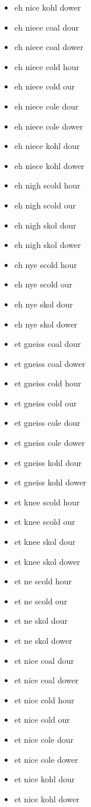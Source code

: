 \begin{itemize}
\item eh nice kohl dower
\item eh niece coal dour
\item eh niece coal dower
\item eh niece cold hour
\item eh niece cold our
\item eh niece cole dour
\item eh niece cole dower
\item eh niece kohl dour
\item eh niece kohl dower
\item eh nigh scold hour
\item eh nigh scold our
\item eh nigh skol dour
\item eh nigh skol dower
\item eh nye scold hour
\item eh nye scold our
\item eh nye skol dour
\item eh nye skol dower
\item et gneiss coal dour
\item et gneiss coal dower
\item et gneiss cold hour
\item et gneiss cold our
\item et gneiss cole dour
\item et gneiss cole dower
\item et gneiss kohl dour
\item et gneiss kohl dower
\item et knee scold hour
\item et knee scold our
\item et knee skol dour
\item et knee skol dower
\item et ne scold hour
\item et ne scold our
\item et ne skol dour
\item et ne skol dower
\item et nice coal dour
\item et nice coal dower
\item et nice cold hour
\item et nice cold our
\item et nice cole dour
\item et nice cole dower
\item et nice kohl dour
\item et nice kohl dower

\end{itemize}
